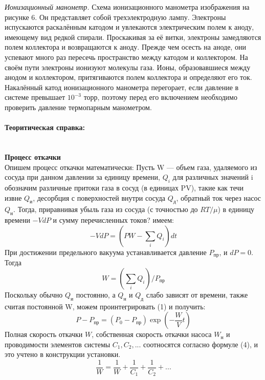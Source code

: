\documentclass[a4paper, 12pt]{article}
\newcommand{\parag}[1]{\paragraph*{#1:}}
\begin{document}
\textit{Ионизационный манометр.} Схема ионизационного манометра изображения на рисунке 6. Он представляет собой трехэлектродную лампу. Электроны испускаются раскалённым катодом и увлекаются электрическим полем к аноду, имеющему вид редкой спирали. Проскакивая за её витки, электроны замедляются полем коллектора и возвращаются к аноду. Прежде чем осесть на аноде, они успевают много раз пересечь пространство между катодом и коллектором. На своём пути электроны ионизуют молекулы газа. Ионы, образовавшиеся между анодом и коллектором, притягиваются полем коллектора и определяют его ток. \\
Накалённый катод ионизационного манометра перегорает, если давление в системе превышает $10^{-3}$ торр, поэтому перед его включением необходимо проверить давление термопарным манометром. \\

\parag {Теоритическая справка} ~\\
\textbf{Процесс откачки}\\
Опишем процесс откачки математически: 
Пусть W --- объем газа, удаляемого из сосуда при данном давлении за единицу времени, $Q_i$ для различных значений i обозначим различные притоки газа в сосуд (в единицах PV), такие как течи извне $Q_\text{и}$, десорбция с поверхностей внутри сосуда $Q_\text{д}$, обратный ток через насос $Q_\text{н}$. Тогда, приравнивая убыль газа из сосуда (с точностью до $RT/\mu$) в единицу времени $-VdP$ и сумму перечисленных токов? имеем:
 \begin{equation}
 	-VdP = (PW - \sum_i Q_i)dt
 \end{equation}
 При достижении предельного вакуума устанавливается давление $P_{\text{пр}}$, и $dP = 0$. Тогда
 \begin{equation}
 	 W = ( \sum_i Q_i )/P_{\text{пр}}
 \end{equation}
 Поскольку обычно $Q_\text{и}$ постоянно, а $Q_\text{н}$ и $Q_\text{д}$ слабо зависят от времени, также считая постоянной W, можем проинтегрировать (1) и получить:
 \begin{equation}
 	P - P_{\text{пр}} = (P_0 - P_{\text{пр}})\exp(-\frac{W}{V}t)
 \end{equation}
Полная скорость откачки $W$, собственная скорость откачки насоса $W_{\text{н}}$ и проводимости элементов системы $C_1, C_2,...$ соотносятся согласно формуле (4), и это учтено в конструкции установки.
 \begin{equation}
 \frac{1}{W} = \frac{1}{W} + \frac{1}{C_1} + \frac{1}{C_2} + ...
\end{equation}
\end{document}
